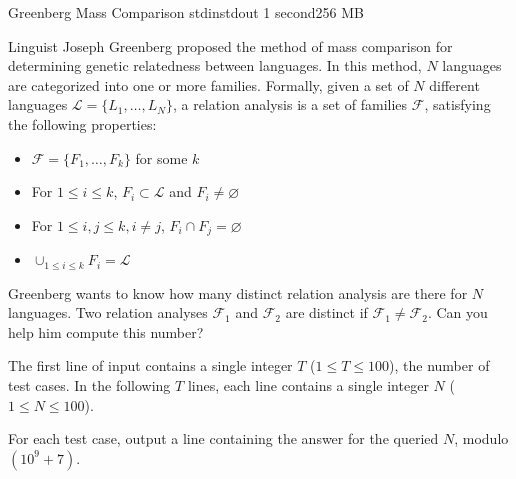 \begin{problem}{Greenberg Mass Comparison}
{stdin}{stdout}
{1 second}{256 MB}{}

Linguist Joseph Greenberg proposed the method of mass comparison for determining genetic relatedness between languages. In this method, $N$ languages are categorized into one or more families. Formally, given a set of $N$ different languages $\mathcal{L} = \{L_1, \hdots, L_N\}$, a relation analysis is a set of families $\mathcal{F}$, satisfying the following properties:
\begin{itemize}
\item $\mathcal{F} = \{F_1, \hdots, F_k\}$ for some $k$
\item For $1 \le i \le k$, $F_i \subset \mathcal{L}$ and $F_i \ne \varnothing$
\item For $1 \le i,j \le k, i \ne j$, $F_i \cap F_j = \varnothing$
\item $\cup_{1 \le i \le k}{F_i} = \mathcal{L}$
\end{itemize}

Greenberg wants to know how many distinct relation analysis are there for $N$ languages. Two relation analyses $\mathcal{F}_1$ and $\mathcal{F}_2$ are distinct if $\mathcal{F}_1 \ne \mathcal{F}_2$. Can you help him compute this number?

\InputFile

The first line of input contains a single integer $T$ ($1 \le T \le 100$), the number of test cases.
In the following $T$ lines, each line contains a single integer $N$ ($1 \le N \le 100$).

\OutputFile

For each test case, output a line containing the answer for the queried $N$, modulo $(10^9+7)$.

\Examples

\begin{example}
%
\end{example}

\end{problem}
